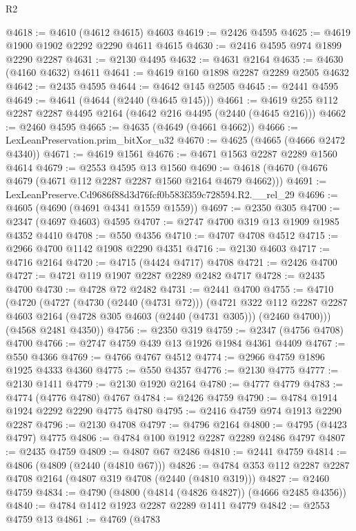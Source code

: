 \begin{lexlean}{R2}
\begin{coremodule}
@4618 := @4610 (@4612 @4615) @4603
@4619 := @2426 @4595
@4625 := @4619 @1900 @1902 @2292 @2290 @4611 @4615
@4630 := @2416 @4595 @974 @1899 @2290 @2287
@4631 := @2130 @4495
@4632 := @4631 @2164
@4635 := @4630 (@4160 @4632) @4611
@4641 := @4619 @160 @1898 @2287 @2289 @2505 @4632
@4642 := @2435 @4595
@4644 := @4642 @145 @2505
@4645 := @2441 @4595
@4649 := @4641 (@4644 (@2440 (@4645 @145)))
@4661 := @4619 @255 @112 @2287 @2287 @4495 @2164 (@4642 @216 @4495 (@2440 (@4645 @216)))
@4662 := @2460 @4595
@4665 := @4635 (@4649 (@4661 @4662))
@4666 := LexLeanPreservation.prim_bitXor_u32
@4670 := @4625 (@4665 (@4666 @2472 @4340))
@4671 := @4619 @1561
@4676 := @4671 @1563 @2287 @2289 @1560 @4614
@4679 := @2553 @4595 @13 @1560
@4690 := @4618 (@4670 (@4676 @4679 (@4671 @112 @2287 @2287 @1560 @2164 @4679 @4662)))
@4691 := LexLeanPreserve.Cd9686f88d3d76fcf0b583f359c728594.R2.__rel_29
@4696 := @4605 (@4690 (@4691 @4341 @1559 @1559))
@4697 := @2350 @305
@4700 := @2347 (@4697 @4603) @4595
@4707 := @2747 @4700 @319 @13 @1909 @1985 @4352 @4410
@4708 := @550 @4356
@4710 := @4707 @4708 @4512
@4715 := @2966 @4700 @1142 @1908 @2290 @4351
@4716 := @2130 @4603
@4717 := @4716 @2164
@4720 := @4715 (@4424 @4717) @4708
@4721 := @2426 @4700
@4727 := @4721 @119 @1907 @2287 @2289 @2482 @4717
@4728 := @2435 @4700
@4730 := @4728 @72 @2482
@4731 := @2441 @4700
@4755 := @4710
    (@4720
      (@4727
        (@4730 (@2440 (@4731 @72)))
        (@4721
          @322
          @112
          @2287
          @2287
          @4603
          @2164
          (@4728 @305 @4603 (@2440 (@4731 @305)))
          (@2460 @4700)))
      (@4568 @2481 @4350))
@4756 := @2350 @319
@4759 := @2347 (@4756 @4708) @4700
@4766 := @2747 @4759 @439 @13 @1926 @1984 @4361 @4409
@4767 := @550 @4366
@4769 := @4766 @4767 @4512
@4774 := @2966 @4759 @1896 @1925 @4333 @4360
@4775 := @550 @4357
@4776 := @2130 @4775
@4777 := @2130 @1411
@4779 := @2130 @1920 @2164
@4780 := @4777 @4779
@4783 := @4774 (@4776 @4780) @4767
@4784 := @2426 @4759
@4790 := @4784 @1914 @1924 @2292 @2290 @4775 @4780
@4795 := @2416 @4759 @974 @1913 @2290 @2287
@4796 := @2130 @4708
@4797 := @4796 @2164
@4800 := @4795 (@4423 @4797) @4775
@4806 := @4784 @100 @1912 @2287 @2289 @2486 @4797
@4807 := @2435 @4759
@4809 := @4807 @67 @2486
@4810 := @2441 @4759
@4814 := @4806 (@4809 (@2440 (@4810 @67)))
@4826 := @4784 @353 @112 @2287 @2287 @4708 @2164 (@4807 @319 @4708 (@2440 (@4810 @319)))
@4827 := @2460 @4759
@4834 := @4790 (@4800 (@4814 (@4826 @4827)) (@4666 @2485 @4356))
@4840 := @4784 @1412 @1923 @2287 @2289 @1411 @4779
@4842 := @2553 @4759 @13
@4861 := @4769
    (@4783

\end{coremodule}
\end{lexlean}
